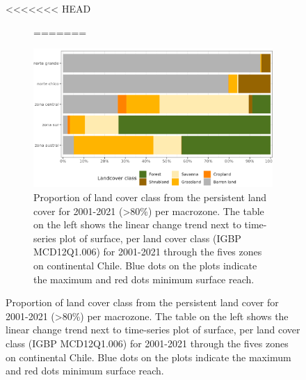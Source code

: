 \documentclass[
  number,
  preprint,
  3p]{elsarticle}
\begin{document}
\begin{figure}[!ht]

<<<<<<< HEAD
\begin{figure}

\begin{minipage}[t]{\linewidth}

{\centering 


}

\end{minipage}%
\newline
\begin{minipage}[t]{\linewidth}

{\centering 


}

\end{minipage}%

\caption{\label{fig-elephants}Proportion of land cover class from the
persistent land cover for 2001-2021 (\textgreater80\%) per macrozone.
The table on the left shows the linear change trend next to time-series
plot of surface, per land cover class (IGBP MCD12Q1.006) for 2001-2021
through the fives zones on continental Chile. Blue dots on the plots
indicate the maximum and red dots minimum surface reach.}
=======
{\centering \includegraphics{../output/figs/LC_pers80_per_macrozone.png}

}
\end{figure}
\end{figure}
\end{document}
